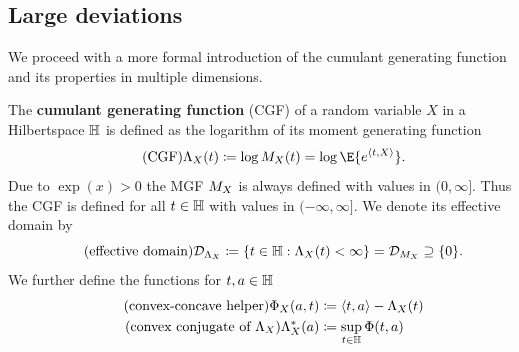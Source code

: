 \subsection{Large deviations}

We proceed with a more formal introduction of the cumulant generating function
and its properties in multiple dimensions.

\begin{definition}
    The \textbf{cumulant generating function} (CGF) of a random variable \(X\)
    in a Hilbertspace \(\mathbb{H}\) is defined as the logarithm of its moment generating
    function
    \[\tag{CGF}
        \CGF_X(t) \coloneq \log \MGF_X(t)
        = \log \E{e^{\scp{t, X}}}.
    \]
    Due to \(\exp(x) > 0\) the MGF \(M_X\) is always defined with values in \((0,
    \infty]\). Thus the CGF is defined for all \(t\in \mathbb{H}\) with values in \((-\infty,
    \infty]\). We denote its effective domain
    by
    \[
        \tag{effective domain}
        \mathcal{D}_{\Lambda_X} \coloneq \{t \in \mathbb{H}: \Lambda_X(t) < \infty\} = \mathcal{D}_{M_X} \supseteq \{0\}.
    \]
    We further define the functions for \(t,a\in \mathbb{H}\)
    \begin{align*}
        \tag{convex-concave helper}
        \Phi_X(a, t) &\coloneq \scp{t, a} - \CGF_X(t)
        \\
        \tag{convex conjugate of \(\CGF_X\)}
        \CGF_X^*(a) &\coloneq \sup_{t\in \hilbert} \Phi(t, a)
    \end{align*}
\end{definition}

